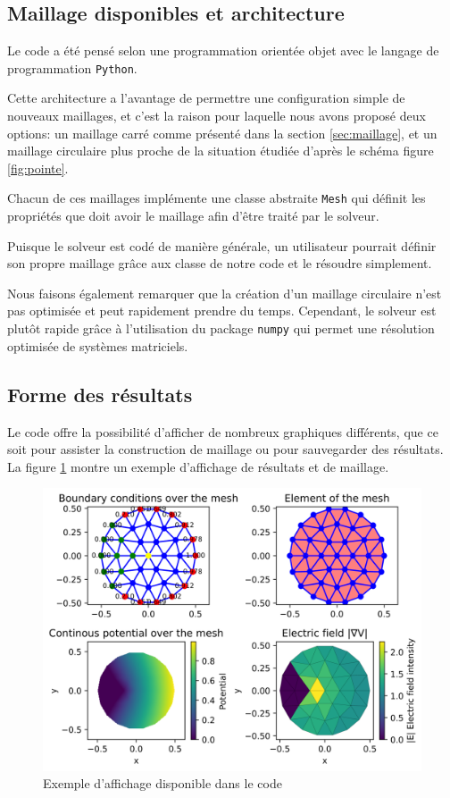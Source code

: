 \documentclass{article}
\begin{document}
\newpage

\subsection{Maillage disponibles et architecture}

Le code a été pensé selon une programmation orientée objet
avec le langage de programmation \verb|Python|.

Cette architecture a l'avantage de permettre une configuration
simple de nouveaux maillages, et c'est la raison pour laquelle
nous avons proposé deux options: un maillage carré comme présenté
dans la section \ref{sec:maillage}, et un maillage circulaire
plus proche de la situation étudiée d'après le schéma
figure \ref{fig:pointe}.

Chacun de ces maillages implémente une classe abstraite
\verb|Mesh| qui définit les propriétés que doit avoir
le maillage afin d'être traité par le solveur.

Puisque le solveur est codé de manière générale, un utilisateur
pourrait définir son propre maillage grâce aux classe de notre
code et le résoudre simplement.

Nous faisons également remarquer que la création d'un maillage
circulaire n'est pas optimisée et peut rapidement prendre du temps.
Cependant, le solveur est plutôt rapide grâce à l'utilisation
du package \verb|numpy| qui permet une résolution optimisée
de systèmes matriciels.


\subsection{Forme des résultats}

Le code offre la possibilité d'afficher de nombreux graphiques
différents, que ce soit pour assister la construction de maillage
ou pour sauvegarder des résultats. La figure \ref{fig:plot_ex}
montre un exemple d'affichage de résultats et de maillage.

\begin{figure}[h]
    \centering
    \includegraphics[scale = 0.8]{img/plot_ex.png}
    \caption{Exemple d'affichage disponible dans le code}
    \label{fig:plot_ex}
\end{figure}
\end{document}
